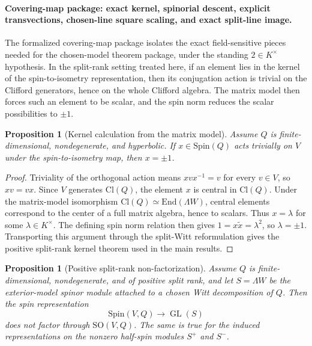 \documentclass{birkjour}
\theoremstyle{plain}
\newtheorem{proposition}[theorem]{Proposition}
\theoremstyle{definition}
\theoremstyle{remark}
\newcommand{\Cl}{\mathrm{Cl}}
\newcommand{\Spin}{\mathrm{Spin}}
\newcommand{\SO}{\mathrm{SO}}
\newcommand{\End}{\mathrm{End}}
\newcommand{\wedgeW}{\Lambda W}
\begin{document}
\paragraph{Covering-map package: exact kernel, spinorial descent, explicit transvections, chosen-line square scaling, and exact split-line image.}
The formalized covering-map package isolates the exact field-sensitive pieces
needed for the chosen-model theorem package, under the standing
$2\in K^\times$ hypothesis. In the split-rank setting treated here, if an
element lies in the kernel of the spin-to-isometry representation, then its
conjugation action is trivial on the Clifford generators, hence on the whole
Clifford algebra. The matrix model then forces such an element to be scalar,
and the spin norm reduces the scalar possibilities to $\pm1$.

\begin{proposition}[Kernel calculation from the matrix model]
\label{prop:kernel-from-matrix}
Assume $Q$ is finite-dimensional, nondegenerate, and hyperbolic. If
$x\in \Spin(Q)$ acts trivially on $V$ under the spin-to-isometry map, then
$x=\pm1$.
\end{proposition}

\begin{proof}
Triviality of the orthogonal action means $xvx^{-1}=v$ for every $v\in V$, so
$xv=vx$. Since $V$ generates $\Cl(Q)$, the element $x$ is central in
$\Cl(Q)$. Under the matrix-model isomorphism
$\Cl(Q)\simeq \End(\wedgeW)$, central elements correspond to the center of a
full matrix algebra, hence to scalars. Thus $x=\lambda$ for some
$\lambda\in K^\times$. The defining spin norm relation then gives
$1=x\tilde x=\lambda^2$, so $\lambda=\pm1$. Transporting this argument through
the split-Witt reformulation gives the positive split-rank kernel theorem used in the
main results.
\end{proof}

\begin{proposition}[Positive split-rank non-factorization]
\label{prop:nonfactorization}
Assume $Q$ is finite-dimensional, nondegenerate, and of positive split rank,
and let $S=\wedgeW$ be the exterior-model spinor module attached to a
chosen Witt decomposition of $Q$. Then the spin representation
\[
  \Spin(V,Q)\to \operatorname{GL}(S)
\]
does not factor through $\SO(V,Q)$. The same is true for the induced
representations on the nonzero half-spin modules $S^+$ and $S^-$.
\end{proposition}
\end{document}
